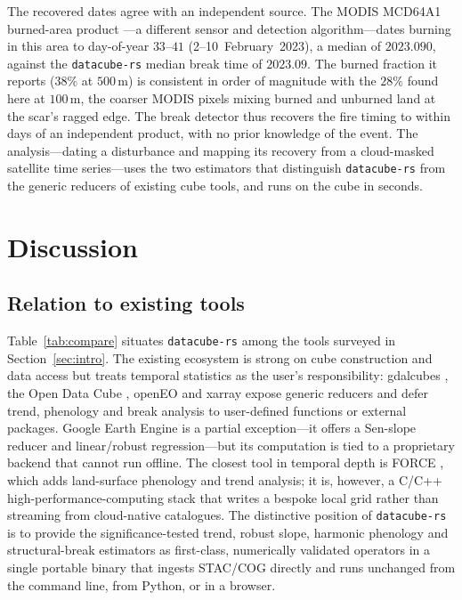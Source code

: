 \documentclass[review]{elsarticle}
\begin{document}
The recovered dates agree with an independent source. The MODIS MCD64A1
burned-area product \citep{giglio2018mcd64}---a different sensor and
detection algorithm---dates burning in this area to day-of-year $33$--$41$
(2--10~February~2023), a median of $2023.090$, against the
\texttt{datacube-rs} median break time of $2023.09$. The burned fraction it
reports ($38\%$ at $500$\,m) is consistent in order of magnitude with the
$28\%$ found here at $100$\,m, the coarser MODIS pixels mixing burned and
unburned land at the scar's ragged edge. The break detector thus recovers
the fire timing to within days of an independent product, with no prior
knowledge of the event. The analysis---dating a disturbance and mapping its
recovery from a cloud-masked satellite time series---uses the two estimators
that distinguish \texttt{datacube-rs} from the generic reducers of existing
cube tools, and runs on the cube in seconds.

\section{Discussion}
\label{sec:discussion}

\subsection{Relation to existing tools}
\label{sec:related}
Table~\ref{tab:compare} situates \texttt{datacube-rs} among the tools surveyed in
Section~\ref{sec:intro}. The existing ecosystem is strong on cube construction
and data access but treats temporal statistics as the user's responsibility:
gdalcubes \citep{appel2019gdalcubes}, the Open Data Cube \citep{lewis2017agdc},
openEO \citep{schramm2021openeo} and xarray \citep{hoyer2017xarray} expose generic
reducers and defer trend, phenology and break analysis to user-defined functions
or external packages. Google Earth Engine \citep{gorelick2017gee} is a partial
exception---it offers a Sen-slope reducer and linear/robust regression---but its
computation is tied to a proprietary backend that cannot run offline. The closest
tool in temporal depth is FORCE \citep{frantz2019force}, which adds land-surface
phenology and trend analysis; it is, however, a C/C++ high-performance-computing
stack that writes a bespoke local grid rather than streaming from cloud-native
catalogues. The distinctive position of \texttt{datacube-rs} is to provide the
significance-tested trend, robust slope, harmonic phenology and structural-break
estimators as first-class, numerically validated operators in a single portable
binary that ingests STAC/COG directly and runs unchanged from the command line,
from Python, or in a browser.
\end{document}
